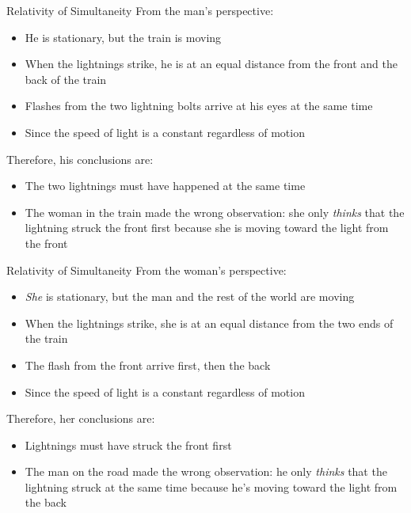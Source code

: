 \documentclass[12pt,compress,aspectratio=169]{beamer}
\begin{document}
\begin{frame}{Relativity of Simultaneity}
  From the man's perspective:
  \begin{itemize}
  \item He is stationary, but the train is moving
  \item When the lightnings strike, he is at an equal distance from the front
    and the back of the train
  \item Flashes from the two lightning bolts arrive at his eyes at the same time
  \item Since the speed of light is a constant regardless of motion
  \end{itemize}
  Therefore, his conclusions are:
  \begin{itemize}
  \item The two lightnings must have happened at the same time
  \item The woman in the train made the wrong observation: she only
    \emph{thinks} that the lightning struck the front first because she is
    moving toward the light from the front
  \end{itemize}
\end{frame}


\begin{frame}{Relativity of Simultaneity}
  From the woman's perspective:
  \begin{itemize}
  \item\emph{She} is stationary, but the man and the rest of the world are
    moving
  \item When the lightnings strike, she is at an equal distance from the two
    ends of the train
  \item The flash from the front arrive first, then the back
  \item Since the speed of light is a constant regardless of motion
  \end{itemize}
  Therefore, her conclusions are:
  \begin{itemize}
  \item Lightnings must have struck the front first
  \item The man on the road made the wrong observation: he only \emph{thinks}
    that the lightning struck at the same time because he's moving toward the
    light from the back
  \end{itemize}
\end{frame}
\end{document}
